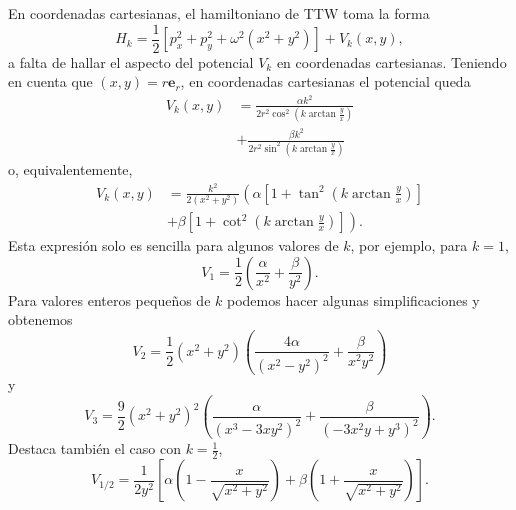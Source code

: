 \documentclass[12pt,a4paper,twocolumn,reqno]{amsart}
\theoremstyle{definition} \newtheorem{defn}[thm]{Definición}
\theoremstyle{definition} \newtheorem{ejemplo}[thm]{Ejemplo}
\theoremstyle{definition} \newtheorem{ejercicio}[thm]{Ejercicio}
\theoremstyle{remark} \newtheorem*{obs}{Observación}
\newcommand{\vect}[1]{\mathbf{#1}}
\begin{document}
En coordenadas cartesianas, el hamiltoniano de TTW toma la forma
\begin{equation*}
  H_k=\frac{1}{2}[p_x^2+p_y^2+\omega^2(x^2+y^2)]+V_k(x,y),
\end{equation*}
a falta de hallar el aspecto del potencial $V_k$ en coordenadas cartesianas.
Teniendo en cuenta que $(x,y)=r\vect{e}_r$, en coordenadas cartesianas el potencial queda
\begin{align*}
  V_k(x,y)&=\frac{\alpha k^2}{2r^2\cos^2(k\arctan \tfrac{y}{x})} \\ &+\frac{\beta k^2}{2r^2\sin^2(k\arctan \tfrac{y}{x})}
\end{align*}
o, equivalentemente,
\begin{align*}
  V_k(x,y)&=\frac{k^2}{2(x^2+y^2)}\left( \alpha\left[ 1+\tan^2\left( k\arctan\frac{y}{x} \right) \right] \right.\\ & \left. +\beta\left[ 1+\cot^2\left( k\arctan\frac{y}{x} \right) \right]\right).
\end{align*}
Esta expresión solo es sencilla para algunos valores de $k$, por ejemplo, para $k=1$,
\begin{equation*}
  V_1=\frac{1}{2}\left( \frac{\alpha}{x^2}+\frac{\beta}{y^2} \right).
\end{equation*}
Para valores enteros pequeños de $k$ podemos hacer algunas simplificaciones y obtenemos
\begin{equation*}
  V_2=\frac{1}{2}(x^2+y^2)\left( \frac{4\alpha}{(x^2-y^2)^2}+\frac{\beta}{x^2y^2} \right)
\end{equation*}
y
\begin{equation*}
  V_3=\frac{9}{2}(x^2+y^2)^2\left( \frac{\alpha}{(x^3-3xy^2)^2}+\frac{\beta}{(-3x^2y+y^3)^2} \right).
\end{equation*}
Destaca también el caso con $k=\tfrac{1}{2}$,
\begin{equation*}
  V_{1/2}=\frac{1}{2y^2}\left[ \alpha\left( 1-\frac{x}{\sqrt{x^2+y^2}} \right)+ \beta\left( 1+\frac{x}{\sqrt{x^2+y^2}} \right) \right].
\end{equation*}
\end{document}
